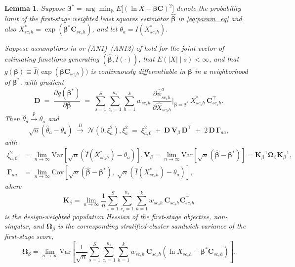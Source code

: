 \documentclass[12pt]{article}
\theoremstyle{plain}
\newtheorem{lemma}{Lemma}
\theoremstyle{definition}
\begin{document}
\noindent\begin{lemma}
\label{lem:clt_theta_a}
Suppose $\boldsymbol\beta^*=\arg\min_{\boldsymbol\beta} E\big[(\ln X-\boldsymbol\beta\mathbf C)^2\big]$
denote the probability limit of the first-stage weighted least squares estimator
$\hat{\boldsymbol\beta}$ in \eqref{eq:param_eq} and also
$X^*_{sc_sh}=\exp(\boldsymbol\beta^*\mathbf C_{sc_sh})$, and let $\theta_a=I(X^*_{sc_sh})$.

Suppose assumptions in \cite{Bhattacharya2007} or (AN1)--(AN12) of \cite{shivam2026asymptotic} hold for the joint vector of estimating functions
generating $(\hat{\boldsymbol\beta},\hat I(\cdot))$, that $E(|X|\mid s)<\infty$, and that
$g(\boldsymbol\beta)\equiv \hat I\big(\exp(\boldsymbol\beta\mathbf C_{sc_sh})\big)$ is
continuously differentiable in $\boldsymbol\beta$ in a neighborhood of $\boldsymbol\beta^*$, with
gradient 
\begin{equation}
\mathbf D
\;=\; \frac{\partial g(\boldsymbol\beta^*)}{\partial\boldsymbol\beta}
\;=\; \sum_{s=1}^{S}\sum_{c_s=1}^{n_s}\sum_{h=1}^{k} w_{sc_sh}\,
\frac{\partial \hat\psi^a_{sc_sh}}{\partial \hat X_{sc_sh}}\bigg|_{\hat{\boldsymbol\beta}=\boldsymbol\beta^*}
\,X^*_{sc_sh}\,\mathbf C_{sc_sh}^\top.
\label{eq:D-gradient}
\end{equation}
Then $\hat\theta_a\xrightarrow{p}\theta_a$ and
\begin{equation}
\sqrt{n}\left( \hat{\theta}_a - \theta_a \right)
\;\xrightarrow{D}\;
\mathcal{N}(0, \xi_a^2), \xi_a^2 \;=\; \xi_{a,0}^2 \;+\; \mathbf D\,\mathbf V_\beta\,\mathbf D^\top \;+\; 2\,\mathbf D\,\boldsymbol\Gamma_{aa},
\label{eq:lem32-clt}
\end{equation}
with
\begin{align}
\xi_{a,0}^2&= \lim_{n\to\infty}\mathrm{Var}\!\left[\sqrt n\left(\hat I(X^*_{sc_sh})-\theta_a\right)\right],
\mathbf V_\beta= \lim_{n\to\infty}\mathrm{Var}\!\left[\sqrt n\left(\hat{\boldsymbol\beta}-\boldsymbol\beta^*\right)\right]
= \mathbf K_\beta^{-1}\boldsymbol\Omega_\beta\mathbf K_\beta^{-1},
\label{eq:Vbeta-def}\\
\boldsymbol\Gamma_{aa} &= \lim_{n\to\infty}\mathrm{Cov}\!\left[\sqrt n\left(\hat{\boldsymbol\beta}-\boldsymbol\beta^*\right),\;\sqrt n\left(\hat I(X^*_{sc_sh})-\theta_a\right)\right],
\label{eq:Gamma-aa-def}
\end{align}
where
\[
\mathbf K_\beta = \lim_{n\to\infty}\frac{1}{n}\sum_{s=1}^S\sum_{c_s=1}^{n_s}\sum_{h=1}^k w_{sc_sh}\,\mathbf C_{sc_sh}\mathbf C_{sc_sh}^\top
\]
is the design-weighted population Hessian of the first-stage objective, non-singular, and $\boldsymbol\Omega_\beta$
is the corresponding stratified-cluster sandwich variance of the first-stage score,
\[
\boldsymbol\Omega_\beta = \lim_{n\to\infty}\mathrm{Var}\!\left[\frac{1}{\sqrt n}\sum_{s=1}^S\sum_{c_s=1}^{n_s}\sum_{h=1}^k w_{sc_sh}\,\mathbf C_{sc_sh}\left(\ln X_{sc_sh}-\boldsymbol\beta^*\mathbf C_{sc_sh}\right)\right].
\]
\end{lemma}
\end{document}
